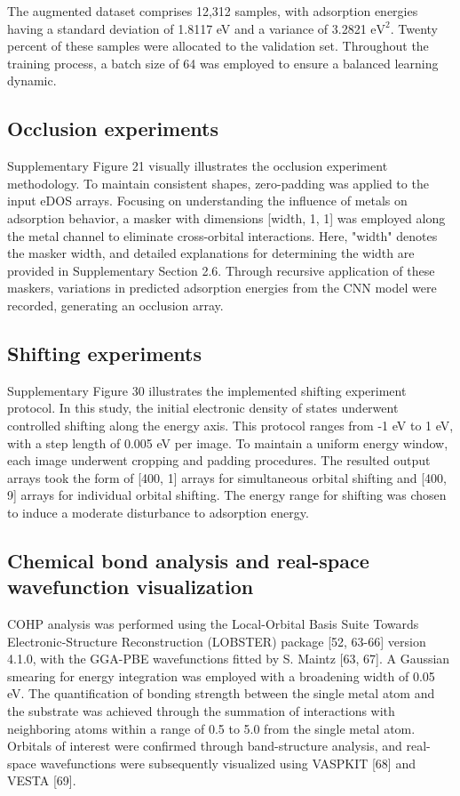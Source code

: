 The augmented dataset comprises 12,312 samples, with adsorption energies having a standard deviation of 1.8117 eV and a variance of 3.2821 $\mathrm{eV}^2$.
Twenty percent of these samples were allocated to the validation set. Throughout the training process, a batch size of 64 was employed to ensure a balanced learning dynamic.


\subsection{Occlusion experiments}
Supplementary Figure 21 visually illustrates the occlusion experiment methodology.
To maintain consistent shapes, zero-padding was applied to the input eDOS arrays.
Focusing on understanding the influence of metals on adsorption behavior, a masker with dimensions [width, 1, 1] was employed along the metal channel to eliminate cross-orbital interactions.
Here, "width" denotes the masker width, and detailed explanations for determining the width are provided in Supplementary Section 2.6.
Through recursive application of these maskers, variations in predicted adsorption energies from the CNN model were recorded, generating an occlusion array.


\subsection{Shifting experiments}
Supplementary Figure 30 illustrates the implemented shifting experiment protocol.
In this study, the initial electronic density of states underwent controlled shifting along the energy axis.
This protocol ranges from -1 eV to 1 eV, with a step length of 0.005 eV per image.
To maintain a uniform energy window, each image underwent cropping and padding procedures.
The resulted output arrays took the form of [400, 1] arrays for simultaneous orbital shifting and [400, 9] arrays for individual orbital shifting.
The energy range for shifting was chosen to induce a moderate disturbance to adsorption energy.


\subsection{Chemical bond analysis and real-space wavefunction visualization}
COHP analysis was performed using the Local-Orbital Basis Suite Towards Electronic-Structure Reconstruction (LOBSTER) package  [52, 63-66] version 4.1.0, with the GGA-PBE wavefunctions fitted by S. Maintz [63, 67].
A Gaussian smearing for energy integration was employed with a broadening width of 0.05 eV.
The quantification of bonding strength between the single metal atom and the substrate was achieved through the summation of interactions with neighboring atoms within a range of 0.5 \text{\AA} to 5.0 \text{\AA} from the single metal atom.
Orbitals of interest were confirmed through band-structure analysis, and real-space wavefunctions were subsequently visualized using VASPKIT [68] and VESTA [69].


